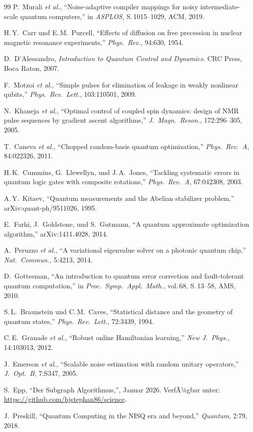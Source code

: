 ﻿\documentclass[11pt,a4paper]{article}
\theoremstyle{definition}
\begin{document}
\begin{thebibliography}{99}
P.\ Murali \textit{et al.},
``Noise-adaptive compiler mappings for noisy intermediate-scale quantum computers,''
in \textit{ASPLOS}, S.\,1015--1029, ACM, 2019.

H.\,Y.\ Carr und E.\,M.\ Purcell,
``Effects of diffusion on free precession in nuclear magnetic resonance experiments,''
\textit{Phys.\ Rev.}, 94:630, 1954.

D.\ D'Alessandro,
\textit{Introduction to Quantum Control and Dynamics}.
CRC Press, Boca Raton, 2007.

F.\ Motzoi \textit{et al.},
``Simple pulses for elimination of leakage in weakly nonlinear qubits,''
\textit{Phys.\ Rev.\ Lett.}, 103:110501, 2009.

N.\ Khaneja \textit{et al.},
``Optimal control of coupled spin dynamics: design of NMR pulse sequences by gradient ascent algorithms,''
\textit{J.\ Magn.\ Reson.}, 172:296--305, 2005.

T.\ Caneva \textit{et al.},
``Chopped random-basis quantum optimization,''
\textit{Phys.\ Rev.\ A}, 84:022326, 2011.

H.\,K.\ Cummins, G.\ Llewellyn, und J.\,A.\ Jones,
``Tackling systematic errors in quantum logic gates with composite rotations,''
\textit{Phys.\ Rev.\ A}, 67:042308, 2003.

A.\,Y.\ Kitaev,
``Quantum measurements and the Abelian stabilizer problem,''
arXiv:quant-ph/9511026, 1995.

E.\ Farhi, J.\ Goldstone, und S.\ Gutmann,
``A quantum approximate optimization algorithm,''
arXiv:1411.4028, 2014.

A.\ Peruzzo \textit{et al.},
``A variational eigenvalue solver on a photonic quantum chip,''
\textit{Nat.\ Commun.}, 5:4213, 2014.

D.\ Gottesman,
``An introduction to quantum error correction and fault-tolerant quantum computation,''
in \textit{Proc.\ Symp.\ Appl.\ Math.}, vol.\,68, S.\,13--58, AMS, 2010.

S.\,L.\ Braunstein und C.\,M.\ Caves,
``Statistical distance and the geometry of quantum states,''
\textit{Phys.\ Rev.\ Lett.}, 72:3439, 1994.

C.\,E.\ Granade \textit{et al.},
``Robust online Hamiltonian learning,''
\textit{New J.\ Phys.}, 14:103013, 2012.

J.\ Emerson \textit{et al.},
``Scalable noise estimation with random unitary operators,''
\textit{J.\ Opt.\ B}, 7:S347, 2005.


S.\ Epp,
``Der Subgraph Algorithmus,'', Januar 2026.
VerfÃ¼gbar unter: \url{https://github.com/hjstephan86/science}.

J.\ Preskill,
``Quantum Computing in the NISQ era and beyond,''
\textit{Quantum}, 2:79, 2018.

\end{thebibliography}
\end{document}
